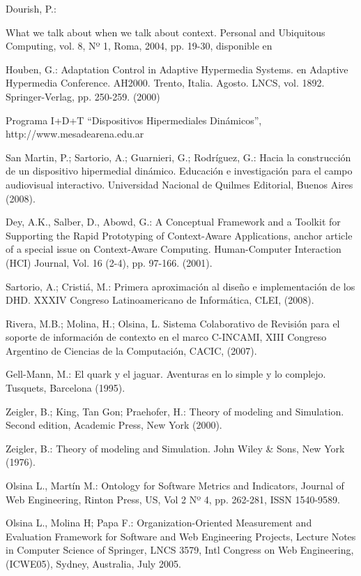 \begin{thebibliography}{1}
Dourish, P.: {What we talk about when we talk about context. Personal
and Ubiquitous Computing, vol. 8, Nº 1, Roma, 2004, pp. 19-30, disponible
en 

Houben, G.: {Adaptation Control in Adaptive Hypermedia Systems. en Adaptive
Hypermedia Conference. AH2000. Trento, Italia. Agosto. LNCS, vol.
1892. Springer-Verlag, pp. 250-259. (2000)}

Programa I+D+T “Dispositivos Hipermediales
Dinámicos”, http://www.mesadearena.edu.ar

San Martin, P.; Sartorio, A.; Guarnieri, G.; Rodríguez, G.: Hacia la
construcción de un dispositivo hipermedial dinámico. Educación e investigación
para el campo audiovisual interactivo. Universidad Nacional de Quilmes
Editorial, Buenos Aires (2008).

Dey, A.K., Salber, D., Abowd, G.: A Conceptual Framework and a Toolkit for
Supporting the Rapid Prototyping of Context-Aware Applications, anchor article
of a special issue on Context-Aware Computing. Human-Computer Interaction (HCI)
Journal, Vol. 16 (2-4), pp. 97-166. (2001).

Sartorio, A.; Cristiá, M.: Primera aproximación al diseño e implementación de
los DHD. XXXIV Congreso Latinoamericano de Informática, CLEI, (2008).

Rivera, M.B.; Molina, H.; Olsina, L. Sistema Colaborativo de Revisión para el
soporte de información de contexto en el marco C-INCAMI, XIII Congreso Argentino
de Ciencias de la Computación, CACIC, (2007).

Gell-Mann, M.: El quark y el jaguar. Aventuras en lo simple y lo complejo.
Tusquets, Barcelona (1995).

Zeigler, B.; King, Tan Gon; Praehofer, H.: Theory of modeling and Simulation.
Second edition, Academic Press, New York (2000).

Zeigler, B.: Theory of modeling and Simulation. John Wiley & Sons, New York
(1976).

Olsina L., Martín M.: Ontology for Software Metrics and Indicators, Journal of
Web Engineering, Rinton Press, US, Vol 2 Nº 4, pp. 262-281, ISSN 1540-9589.


Olsina L., Molina H; Papa F.: Organization-Oriented Measurement and Evaluation
Framework for Software and Web Engineering Projects, Lecture Notes in Computer
Science of Springer, LNCS 3579, Intl Congress on Web Engineering, (ICWE05),
Sydney, Australia, July 2005.


}
\end{thebibliography}
